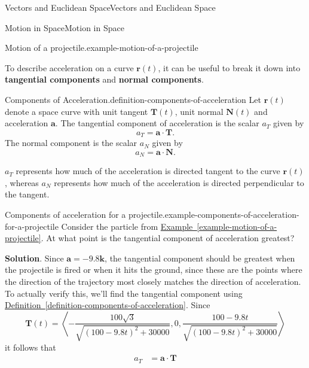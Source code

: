 \documentclass[10pt,]{book}
\newcommand{\terminology}[1]{\textbf{#1}}
\numberwithin{equation}{section}
\newcommand{\vv}[1]{\mathbf{#1}}
\newcommand{\dotprod}[1]{\left\langle #1 \right\rangle}
\begin{document}
\begin{chapterptx}{Vectors and Euclidean Space}{}{Vectors and Euclidean Space}{}{}
\begin{sectionptx}{Motion in Space}{}{Motion in Space}{}{}
\begin{example}{Motion of a projectile.}{example-motion-of-a-projectile}
\end{example}
\hypertarget{p-1100}{}%
To describe acceleration on a curve \(\vv{r}(t)\), it can be useful to break it down into \terminology{tangential components} and \terminology{normal components}.%
\begin{definition}{Components of Acceleration.}{definition-components-of-acceleration}%
\hypertarget{p-1101}{}%
Let \(\vv{r}(t)\) denote a space curve with unit tangent \(\vv{T}(t)\), unit normal \(\vv{N}(t)\) and acceleration \(\vv{a}\). The tangential component of acceleration is the scalar \(a_{T}\) given by%
%
\begin{equation*}
a_{T} = \vv{a}\cdot\vv{T}.
\end{equation*}
\hypertarget{p-1102}{}%
The normal component is the scalar \(a_{N}\) given by%
%
\begin{equation*}
a_{N} = \vv{a}\cdot\vv{N}.
\end{equation*}
\end{definition}
\hypertarget{p-1103}{}%
\(a_{T}\) represents how much of the acceleration is directed tangent to the curve \(\vv{r}(t)\), whereas \(a_{N}\) represents how much of the acceleration is directed perpendicular to the tangent.%
\begin{example}{Components of acceleration for a projectile.}{example-components-of-acceleration-for-a-projectile}%
\hypertarget{p-1104}{}%
Consider the particle from \hyperref[example-motion-of-a-projectile]{Example~\ref{example-motion-of-a-projectile}}. At what point is the tangential component of acceleration greatest?%
\par\smallskip%
\noindent\textbf{Solution}.\hypertarget{solution-168}{}\quad%
\hypertarget{p-1105}{}%
Since \(\vv{a} = -9.8\vv{k}\), the tangential component should be greatest when the projectile is fired or when it hits the ground, since these are the points where the direction of the trajectory most closely matches the direction of acceleration. To actually verify this, we'll find the tangential component using \hyperref[definition-components-of-acceleration]{Definition~\ref{definition-components-of-acceleration}}. Since%
%
\begin{equation*}
\vv{T}(t) = \dotprod{-\frac{100\sqrt{3}}{\sqrt{(100-9.8t)^{2}+30000}}, 0, \frac{100 - 9.8t}{\sqrt{(100-9.8t)^{2}+30000}}}
\end{equation*}
\hypertarget{p-1106}{}%
it follows that%
%
\begin{align*}
a_{T} & = \vv{a}\cdot\vv{T} \\

\end{align*}
\end{example}
\end{sectionptx}
\end{chapterptx}
\end{document}
